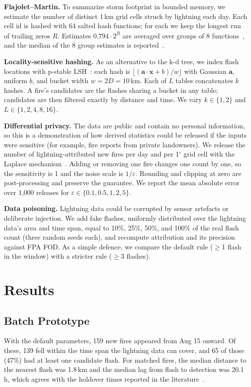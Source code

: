 \documentclass[10pt,journal,compsoc]{IEEEtran}
\begin{document}
\textbf{Flajolet--Martin.} To summarize storm footprint in bounded memory, we estimate the number of distinct 1\,km grid cells struck by lightning each day. Each cell id is hashed with 64 salted hash functions; for each we keep the longest run of trailing zeros $R$. Estimates $0.794 \cdot 2^{\bar R}$ are averaged over groups of 8 functions~\cite{durand2003loglog}, and the median of the 8 group estimates is reported~\cite{leskovec2020mmds}.

\textbf{Locality-sensitive hashing.} As an alternative to the k-d tree, we index flash locations with p-stable LSH~\cite{datar2004pstable}: each hash is $\lfloor (\mathbf{a}\cdot\mathbf{x} + b)/w \rfloor$ with Gaussian $\mathbf{a}$, uniform $b$, and bucket width $w = 2D = 10$\,km. Each of $L$ tables concatenates $k$ hashes. A fire's candidates are the flashes sharing a bucket in any table; candidates are then filtered exactly by distance and time. We vary $k \in \{1, 2\}$ and $L \in \{1, 2, 4, 8, 16\}$.

\textbf{Differential privacy.} The data are public and contain no personal information, so this is a demonstration of how derived statistics could be released if the inputs were sensitive (for example, fire reports from private landowners). We release the number of lightning-attributed new fires per day and per 1$^\circ$ grid cell with the Laplace mechanism~\cite{dwork2006calibrating}. Adding or removing one fire changes one count by one, so the sensitivity is 1 and the noise scale is $1/\varepsilon$. Rounding and clipping at zero are post-processing and preserve the guarantee. We report the mean absolute error over 1,000 releases for $\varepsilon \in \{0.1, 0.5, 1, 2, 5\}$.

\textbf{Data poisoning.} Lightning data could be corrupted by sensor artefacts or deliberate injection. We add fake flashes, uniformly distributed over the lightning data's area and time span, equal to 10\%, 25\%, 50\%, and 100\% of the real flash count (three random seeds each), and recompute attribution and its precision against FPA FOD. As a simple defence, we compare the default rule ($\geq$1 flash in the window) with a stricter rule ($\geq$3 flashes).

\section{Results}

\subsection{Batch Prototype}
With the default parameters, 159 new fires appeared from Aug 15 onward. Of these, 139 fell within the time span the lightning data can cover, and 65 of those (47\%) had at least one candidate flash. For matched fires, the median distance to the nearest flash was 1.8\,km and the median lag from flash to detection was 20.1\,h, which agrees with the holdover times reported in the literature~\cite{moris2023holdover,kalashnikov2023liw}.
\end{document}
